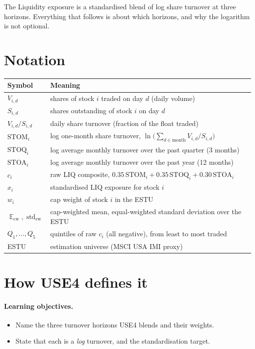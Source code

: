\documentclass[11pt]{article}
\theoremstyle{definition}
\theoremstyle{plain}
\theoremstyle{remark}
\DeclareMathOperator{\std}{std}
\DeclareMathOperator*{\avg}{\mathbb{E}}
\begin{document}
\begin{keyresult}
The Liquidity exposure is a standardised blend of log share turnover at three horizons. Everything that follows is about which horizons, and why the logarithm is not optional.
\end{keyresult}

\section*{Notation}

\begin{center}
\begin{tabular}{@{}ll@{}}
\toprule
Symbol & Meaning \\
\midrule
$V_{i,d}$ & shares of stock $i$ traded on day $d$ (daily volume) \\
$S_{i,d}$ & shares outstanding of stock $i$ on day $d$ \\
$V_{i,d}/S_{i,d}$ & daily share turnover (fraction of the float traded) \\
$\text{STOM}_i$ & log one-month share turnover, $\ln\!\big(\sum_{d\in\text{month}} V_{i,d}/S_{i,d}\big)$ \\
$\text{STOQ}_i$ & log average monthly turnover over the past quarter (3 months) \\
$\text{STOA}_i$ & log average monthly turnover over the past year (12 months) \\
$c_i$ & raw LIQ composite, $0.35\,\text{STOM}_i+0.35\,\text{STOQ}_i+0.30\,\text{STOA}_i$ \\
$x_i$ & standardised LIQ exposure for stock $i$ \\
$w_i$ & cap weight of stock $i$ in the ESTU \\
$\avg_{\text{cw}}, \std_{\text{ew}}$ & cap-weighted mean, equal-weighted standard deviation over the ESTU \\
$Q_1,\dots,Q_5$ & quintiles of raw $c_i$ (all negative), from least to most traded \\
ESTU & estimation universe (MSCI USA IMI proxy) \\
\bottomrule
\end{tabular}
\end{center}

\section{How USE4 defines it}\label{sec:def}

\paragraph{Learning objectives.}
\begin{itemize}[leftmargin=1.4em,topsep=2pt]
  \item Name the three turnover horizons USE4 blends and their weights.
  \item State that each is a \emph{log} turnover, and the standardisation target.
\end{itemize}
\end{document}
